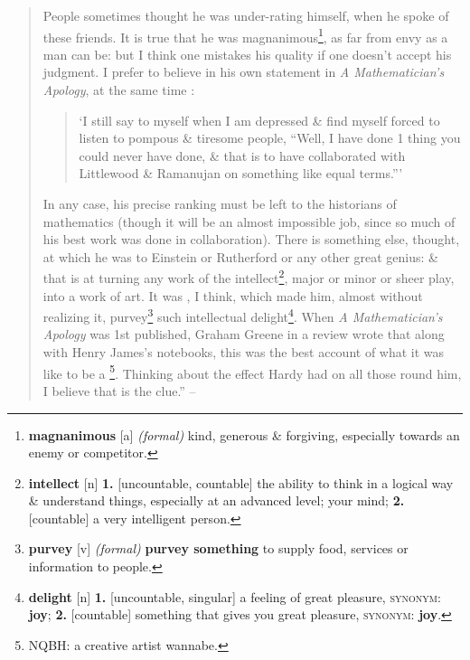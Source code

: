 \documentclass[oneside]{book}
\numberwithin{equation}{section}
\begin{document}
\begin{quotation}
	People sometimes thought he was under-rating himself, when he spoke of these friends. It is true that he was magnanimous\footnote{\textbf{magnanimous} [a] \textit{(formal)} kind, generous \& forgiving, especially towards an enemy or competitor.}, as far from envy as a man can be: but I think one mistakes his quality if one doesn't accept his judgment. I prefer to believe in his own statement in \textit{A Mathematician's Apology}, at the same time :
	\begin{quotation}
		`I still say to myself when I am depressed \& find myself forced to listen to pompous \& tiresome people, ``Well, I have done 1 thing you could never have done, \& that is to have collaborated with Littlewood \& Ramanujan on something like equal terms.'''
	\end{quotation}
	In any case, his precise ranking must be left to the historians of mathematics (though it will be an almost impossible job, since so much of his best work was done in collaboration). There is something else, thought, at which he was  to Einstein or Rutherford or any other great genius: \& that is at turning any work of the intellect\footnote{\textbf{intellect} [n] \textbf{1.} [uncountable, countable] the ability to think in a logical way \& understand things, especially at an advanced level; your mind; \textbf{2.} [countable] a very intelligent person.}, major or minor or sheer play, into a work of art. It was , I think, which made him, almost without realizing it, purvey\footnote{\textbf{purvey} [v] \textit{(formal)} \textbf{purvey something} to supply food, services or information to people.} such intellectual delight\footnote{\textbf{delight} [n] \textbf{1.} [uncountable, singular] a feeling of great pleasure, \textsc{synonym}: \textbf{joy}; \textbf{2.} [countable] something that gives you great pleasure, \textsc{synonym}: \textbf{joy}.}. When \textit{A Mathematician's Apology} was 1st published, Graham Greene in a review wrote that along with Henry James's notebooks, this was the best account of what it was like to be a \footnote{NQBH: a creative artist wannabe.}. Thinking about the effect Hardy had on all those round him, I believe that is the clue.'' -- \cite[Foreword, pp. 12--13]{Hardy1992}
\end{quotation}


\printbibliography[heading=bibintoc]
	
\end{document}

